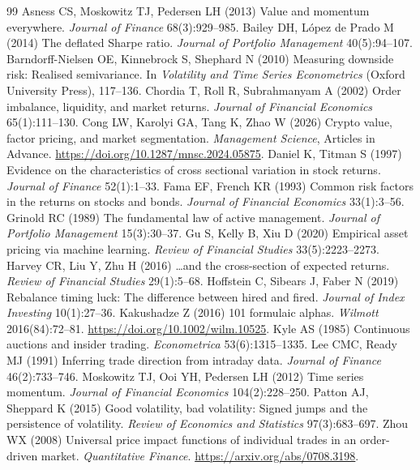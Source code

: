 \documentclass[11pt,letterpaper]{article}
\begin{document}
\newpage
\begin{thebibliography}{99}
 Asness CS, Moskowitz TJ, Pedersen LH (2013) Value and momentum everywhere. \emph{Journal of Finance} 68(3):929--985.
 Bailey DH, L\'opez de Prado M (2014) The deflated Sharpe ratio. \emph{Journal of Portfolio Management} 40(5):94--107.
 Barndorff-Nielsen OE, Kinnebrock S, Shephard N (2010) Measuring downside risk: Realised semivariance. In \emph{Volatility and Time Series Econometrics} (Oxford University Press), 117--136.
 Chordia T, Roll R, Subrahmanyam A (2002) Order imbalance, liquidity, and market returns. \emph{Journal of Financial Economics} 65(1):111--130.
 Cong LW, Karolyi GA, Tang K, Zhao W (2026) Crypto value, factor pricing, and market segmentation. \emph{Management Science}, Articles in Advance. \url{https://doi.org/10.1287/mnsc.2024.05875}.
 Daniel K, Titman S (1997) Evidence on the characteristics of cross sectional variation in stock returns. \emph{Journal of Finance} 52(1):1--33.
 Fama EF, French KR (1993) Common risk factors in the returns on stocks and bonds. \emph{Journal of Financial Economics} 33(1):3--56.
 Grinold RC (1989) The fundamental law of active management. \emph{Journal of Portfolio Management} 15(3):30--37.
 Gu S, Kelly B, Xiu D (2020) Empirical asset pricing via machine learning. \emph{Review of Financial Studies} 33(5):2223--2273.
 Harvey CR, Liu Y, Zhu H (2016) \ldots and the cross-section of expected returns. \emph{Review of Financial Studies} 29(1):5--68.
 Hoffstein C, Sibears J, Faber N (2019) Rebalance timing luck: The difference between hired and fired. \emph{Journal of Index Investing} 10(1):27--36.
 Kakushadze Z (2016) 101 formulaic alphas. \emph{Wilmott} 2016(84):72--81. \url{https://doi.org/10.1002/wilm.10525}.
 Kyle AS (1985) Continuous auctions and insider trading. \emph{Econometrica} 53(6):1315--1335.
 Lee CMC, Ready MJ (1991) Inferring trade direction from intraday data. \emph{Journal of Finance} 46(2):733--746.
 Moskowitz TJ, Ooi YH, Pedersen LH (2012) Time series momentum. \emph{Journal of Financial Economics} 104(2):228--250.
 Patton AJ, Sheppard K (2015) Good volatility, bad volatility: Signed jumps and the persistence of volatility. \emph{Review of Economics and Statistics} 97(3):683--697.
 Zhou WX (2008) Universal price impact functions of individual trades in an order-driven market. \emph{Quantitative Finance}. \url{https://arxiv.org/abs/0708.3198}.
\end{thebibliography}
\end{document}
